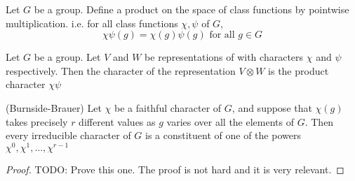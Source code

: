 \begin{definition}
    Let $G$ be a group. Define a product on the space of class functions by pointwise multiplication. i.e.
    for all class functions $\chi, \psi$ of $G$, 
    \[
        \chi\psi(g) = \chi(g)\psi(g) \text{ for all } g \in G
    \]
\end{definition}


\begin{proposition}
    Let $G$ be a group. Let $V$ and $W$ be representations of with characters $\chi$ and $\psi$ respectively. Then 
    the character of the representation $V \otimes W$ is the product character $\chi\psi$
\end{proposition}


\begin{theorem}(Burnside-Brauer)
    Let $\chi$ be a faithful character of $G$, and suppose that $\chi(g)$ takes precisely $r$ different values as 
    $g$ varies over all the elements of $G$. Then every irreducible character of $G$ is a constituent of one of the 
    powers $\chi^0, \chi^1, ... , \chi^{r-1}$
\end{theorem}

\begin{proof}
    TODO: Prove this one. The proof is not hard and it is very relevant.
\end{proof}
